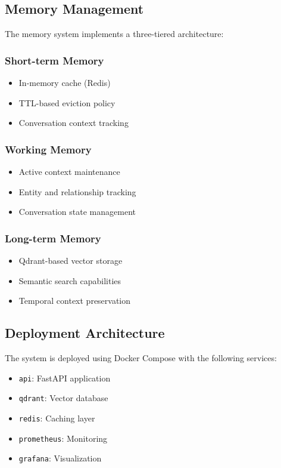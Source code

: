 \subsection{Memory Management}
The memory system implements a three-tiered architecture:

\subsubsection{Short-term Memory}
\begin{itemize}
    \item In-memory cache (Redis)
    \item TTL-based eviction policy
    \item Conversation context tracking
\end{itemize}

\subsubsection{Working Memory}
\begin{itemize}
    \item Active context maintenance
    \item Entity and relationship tracking
    \item Conversation state management
\end{itemize}

\subsubsection{Long-term Memory}
\begin{itemize}
    \item Qdrant-based vector storage
    \item Semantic search capabilities
    \item Temporal context preservation
\end{itemize}

\subsection{Deployment Architecture}
The system is deployed using Docker Compose with the following services:
\begin{itemize}
    \item \texttt{api}: FastAPI application
    \item \texttt{qdrant}: Vector database
    \item \texttt{redis}: Caching layer
    \item \texttt{prometheus}: Monitoring
    \item \texttt{grafana}: Visualization
\end{itemize}

